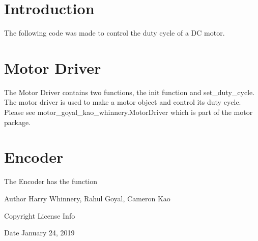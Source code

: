 \hypertarget{index_sec_intro}{}\section{Introduction}\label{index_sec_intro}
The following code was made to control the duty cycle of a DC motor.\hypertarget{index_sec_mot}{}\section{Motor Driver}\label{index_sec_mot}
The Motor Driver contains two functions, the init function and set\+\_\+duty\+\_\+cycle. The motor driver is used to make a motor object and control its duty cycle. Please see motor\+\_\+goyal\+\_\+kao\+\_\+whinnery.\+Motor\+Driver which is part of the motor package.\hypertarget{index_sec_enc}{}\section{Encoder}\label{index_sec_enc}
The Encoder has the function \begin{DoxyAuthor}{Author}
Harry Whinnery, Rahul Goyal, Cameron Kao
\end{DoxyAuthor}
\begin{DoxyCopyright}{Copyright}
License Info
\end{DoxyCopyright}
\begin{DoxyDate}{Date}
January 24, 2019 
\end{DoxyDate}
